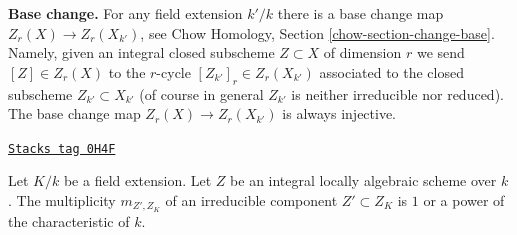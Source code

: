\medskip\noindent
{\bf Base change.} For any field extension $k'/k$ there is a base change
map $Z_r(X) \to Z_r(X_{k'})$, see
Chow Homology, Section \ref{chow-section-change-base}.
Namely, given an integral closed subscheme $Z \subset X$
of dimension $r$ we send $[Z] \in Z_r(X)$ to the $r$-cycle
$[Z_{k'}]_r \in Z_r(X_{k'})$ associated to the closed subscheme
$Z_{k'} \subset X_{k'}$ (of course in general $Z_{k'}$
is neither irreducible nor reduced). The base change map
$Z_r(X) \to Z_r(X_{k'})$ is always injective.

\begin{lemma}
\label{relative-cycles-lemma-multiplicities-field-extension}
\href{https://stacks.math.columbia.edu/tag/0H4F}{\texttt{Stacks tag 0H4F}}

Let $K/k$ be a field extension. Let $Z$ be an integral locally algebraic
scheme over $k$. The multiplicity $m_{Z', Z_K}$ of an irreducible
component $Z' \subset Z_K$ is $1$ or a power of the characteristic of $k$.
\end{lemma}

